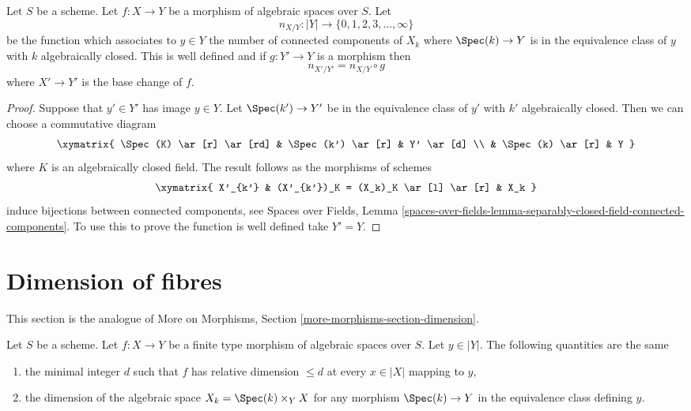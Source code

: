 \begin{lemma}
\label{lemma-base-change-fibres-nr-geometrically-connected-components}
Let $S$ be a scheme.
Let $f : X \to Y$ be a morphism of algebraic spaces over $S$. Let
$$
n_{X/Y} : |Y| \to \{0, 1, 2, 3, \ldots, \infty\}
$$
be the function which associates to $y \in Y$ the number of connected
components of $X_k$ where $\Spec(k) \to Y$ is in the equivalence
class of $y$ with $k$ algebraically closed.
This is well defined and if $g : Y' \to Y$ is a morphism then
$$
n_{X'/Y'} = n_{X/Y} \circ g
$$
where $X' \to Y'$ is the base change of $f$.
\end{lemma}

\begin{proof}
Suppose that $y' \in Y'$ has image $y \in Y$. Let $\Spec(k') \to Y'$
be in the equivalence class of $y'$ with $k'$ algebraically closed.
Then we can choose a commutative diagram
$$
\xymatrix{
\Spec(K) \ar[r] \ar[rd] &
\Spec(k') \ar[r] & Y' \ar[d] \\
& \Spec(k) \ar[r] & Y
}
$$
where $K$ is an algebraically closed field.
The result follows as the morphisms of schemes
$$
\xymatrix{
X'_{k'} & (X'_{k'})_K = (X_k)_K \ar[l] \ar[r] & X_k
}
$$
induce bijections between connected components, see
Spaces over Fields, Lemma
\ref{spaces-over-fields-lemma-separably-closed-field-connected-components}.
To use this to prove the function is well defined take $Y' = Y$.
\end{proof}







\section{Dimension of fibres}
\label{section-dimension}

\noindent
This section is the analogue of
More on Morphisms, Section \ref{more-morphisms-section-dimension}.

\begin{lemma}
\label{lemma-dimension-fibre}
Let $S$ be a scheme. Let $f : X \to Y$ be a finite type morphism of
algebraic spaces over $S$. Let $y \in |Y|$. The following quantities
are the same
\begin{enumerate}
\item the minimal integer $d$ such that $f$ has relative dimension $\leq d$
at every $x \in |X|$ mapping to $y$,
\item the dimension of the algebraic space $X_k = \Spec(k) \times_Y X$
for any morphism $\Spec(k) \to Y$ in the equivalence class defining $y$.
\end{enumerate}
\end{lemma}

